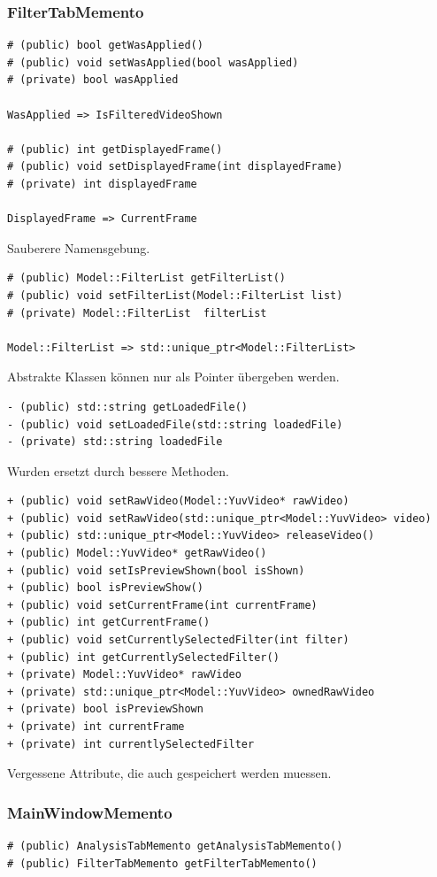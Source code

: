 \documentclass{scrartcl}
\begin{document}
{\subsubsection{FilterTabMemento}
\bigskip
\begin{verbatim}
# (public) bool getWasApplied()
# (public) void setWasApplied(bool wasApplied)
# (private) bool wasApplied

WasApplied => IsFilteredVideoShown

# (public) int getDisplayedFrame()
# (public) void setDisplayedFrame(int displayedFrame)
# (private) int displayedFrame

DisplayedFrame => CurrentFrame
\end{verbatim}
Sauberere Namensgebung.
\bigskip
\begin{verbatim}
# (public) Model::FilterList getFilterList()
# (public) void setFilterList(Model::FilterList list)
# (private) Model::FilterList  filterList

Model::FilterList => std::unique_ptr<Model::FilterList>
\end{verbatim}
Abstrakte Klassen können nur als Pointer übergeben werden.
\bigskip
\begin{verbatim}
- (public) std::string getLoadedFile()
- (public) void setLoadedFile(std::string loadedFile)
- (private) std::string loadedFile
\end{verbatim}
Wurden ersetzt durch bessere Methoden.
\bigskip
\begin{verbatim}
+ (public) void setRawVideo(Model::YuvVideo* rawVideo)
+ (public) void setRawVideo(std::unique_ptr<Model::YuvVideo> video)
+ (public) std::unique_ptr<Model::YuvVideo> releaseVideo()
+ (public) Model::YuvVideo* getRawVideo()
+ (public) void setIsPreviewShown(bool isShown)
+ (public) bool isPreviewShow()
+ (public) void setCurrentFrame(int currentFrame)
+ (public) int getCurrentFrame()
+ (public) void setCurrentlySelectedFilter(int filter)
+ (public) int getCurrentlySelectedFilter()
+ (private) Model::YuvVideo* rawVideo
+ (private) std::unique_ptr<Model::YuvVideo> ownedRawVideo
+ (private) bool isPreviewShown
+ (private) int currentFrame
+ (private) int currentlySelectedFilter
\end{verbatim}
Vergessene Attribute, die auch gespeichert werden muessen.
\newpage
\subsubsection{MainWindowMemento}
\bigskip
\begin{verbatim}
# (public) AnalysisTabMemento getAnalysisTabMemento()
# (public) FilterTabMemento getFilterTabMemento()


\end{verbatim}}
\end{document}
